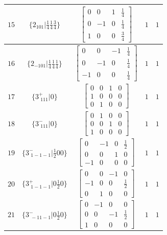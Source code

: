 \documentclass[fleqn,8pt]{jsarticle}
\begin{document}
\begin{longtable}{ccccc}
$ 15 $ & $ \{2{}_{101}|\frac{1}{4} \frac{1}{4} \frac{3}{4}\} $ & $ \begin{bmatrix} 0 & 0 & 1 & \frac{1}{4} \\ 0 & -1 & 0 & \frac{1}{4} \\ 1 & 0 & 0 & \frac{3}{4} \end{bmatrix} $ & $ 1 $ & $ 1 $ \\ \hline
$ 16 $ & $ \{2{}_{-101}|\frac{1}{4} \frac{1}{4} \frac{1}{4}\} $ & $ \begin{bmatrix} 0 & 0 & -1 & \frac{1}{4} \\ 0 & -1 & 0 & \frac{1}{4} \\ -1 & 0 & 0 & \frac{1}{4} \end{bmatrix} $ & $ 1 $ & $ 1 $ \\ \hline
$ 17 $ & $ \{3^{+}_{\,\,111}|0\} $ & $ \begin{bmatrix} 0 & 0 & 1 & 0 \\ 1 & 0 & 0 & 0 \\ 0 & 1 & 0 & 0 \end{bmatrix} $ & $ 1 $ & $ 1 $ \\ \hline
$ 18 $ & $ \{3^{-}_{\,\,111}|0\} $ & $ \begin{bmatrix} 0 & 1 & 0 & 0 \\ 0 & 0 & 1 & 0 \\ 1 & 0 & 0 & 0 \end{bmatrix} $ & $ 1 $ & $ 1 $ \\ \hline
$ 19 $ & $ \{3^{-}_{\,\,1-1-1}|\frac{1}{2} 0 0\} $ & $ \begin{bmatrix} 0 & -1 & 0 & \frac{1}{2} \\ 0 & 0 & 1 & 0 \\ -1 & 0 & 0 & 0 \end{bmatrix} $ & $ 1 $ & $ 1 $ \\ \hline
$ 20 $ & $ \{3^{+}_{\,\,1-1-1}|0 \frac{1}{2} 0\} $ & $ \begin{bmatrix} 0 & 0 & -1 & 0 \\ -1 & 0 & 0 & \frac{1}{2} \\ 0 & 1 & 0 & 0 \end{bmatrix} $ & $ 1 $ & $ 1 $ \\ \hline
$ 21 $ & $ \{3^{-}_{\,\,-11-1}|0 \frac{1}{2} 0\} $ & $ \begin{bmatrix} 0 & -1 & 0 & 0 \\ 0 & 0 & -1 & \frac{1}{2} \\ 1 & 0 & 0 & 0 \end{bmatrix} $ & $ 1 $ & $ 1 $ \\ \hline

\end{longtable}
\end{document}
